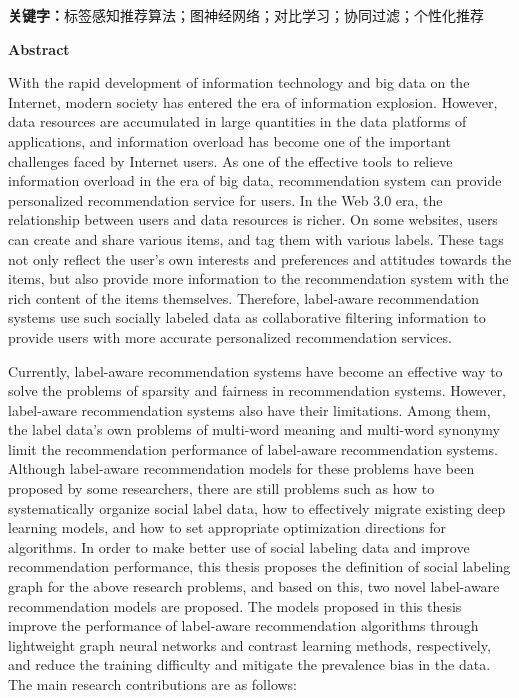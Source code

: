\vspace{20pt}
\noindent \textbf{关键字：}标签感知推荐算法；图神经网络；对比学习；协同过滤；个性化推荐

\clearpage
{}
\begin{center}
    \textbf{ Abstract}
\end{center}

With the rapid development of information technology and big data on the Internet, modern society has entered the era of information explosion. However, data resources are accumulated in large quantities in the data platforms of applications, and information overload has become one of the important challenges faced by Internet users. As one of the effective tools to relieve information overload in the era of big data, recommendation system can provide personalized recommendation service for users. In the Web 3.0 era, the relationship between users and data resources is richer. On some websites, users can create and share various items, and tag them with various labels. These tags not only reflect the user's own interests and preferences and attitudes towards the items, but also provide more information to the recommendation system with the rich content of the items themselves. Therefore, label-aware recommendation systems use such socially labeled data as collaborative filtering information to provide users with more accurate personalized recommendation services.

Currently, label-aware recommendation systems have become an effective way to solve the problems of sparsity and fairness in recommendation systems. However, label-aware recommendation systems also have their limitations. Among them, the label data's own problems of multi-word meaning and multi-word synonymy limit the recommendation performance of label-aware recommendation systems. Although label-aware recommendation models for these problems have been proposed by some researchers, there are still problems such as how to systematically organize social label data, how to effectively migrate existing deep learning models, and how to set appropriate optimization directions for algorithms. In order to make better use of social labeling data and improve recommendation performance, this thesis proposes the definition of social labeling graph for the above research problems, and based on this, two novel label-aware recommendation models are proposed. The models proposed in this thesis improve the performance of label-aware recommendation algorithms through lightweight graph neural networks and contrast learning methods, respectively, and reduce the training difficulty and mitigate the prevalence bias in the data. The main research contributions are as follows:

